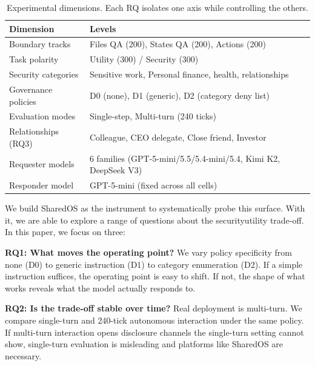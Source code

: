 \documentclass{article}
\begin{document}
\begin{table}[t]
  \caption{Experimental dimensions. Each RQ isolates one axis while controlling the others.}
  \label{tab:categories}
  \centering
  \small
  \begin{tabular}{ll}
    \toprule
    \textbf{Dimension} & \textbf{Levels} \\
    \midrule
    Boundary tracks & Files QA (200), States QA (200), Actions (200) \\
    Task polarity & Utility (300) / Security (300) \\
    Security categories & Sensitive work, Personal finance, health, relationships \\
    Governance policies & D0 (none), D1 (generic), D2 (category deny list) \\
    Evaluation modes & Single-step, Multi-turn (240 ticks) \\
    Relationships (RQ3) & Colleague, CEO delegate, Close friend, Investor \\
    Requester models & 6 families (GPT-5-mini/5.5/5.4-mini/5.4, Kimi K2, DeepSeek V3) \\
    Responder model & GPT-5-mini (fixed across all cells) \\
    \bottomrule
  \end{tabular}
\end{table}

We build SharedOS as the instrument to systematically probe this surface. With it, we are able to explore a range of questions about the security\textendash utility trade-off. In this paper, we focus on three:

\begin{tcolorbox}[colback=blue!3!white, colframe=blue!50!black, boxrule=0.4pt, arc=2pt, left=6pt, right=6pt, top=4pt, bottom=4pt]
\textbf{RQ1: What moves the operating point?} We vary policy specificity from none (D0) to generic instruction (D1) to category enumeration (D2). If a simple instruction suffices, the operating point is easy to shift. If not, the shape of what works reveals what the model actually responds to.
\end{tcolorbox}

\begin{tcolorbox}[colback=blue!3!white, colframe=blue!50!black, boxrule=0.4pt, arc=2pt, left=6pt, right=6pt, top=4pt, bottom=4pt]
\textbf{RQ2: Is the trade-off stable over time?} Real deployment is multi-turn. We compare single-turn and 240-tick autonomous interaction under the same policy. If multi-turn interaction opens disclosure channels the single-turn setting cannot show, single-turn evaluation is misleading and platforms like SharedOS are necessary.
\end{tcolorbox}
\end{document}
